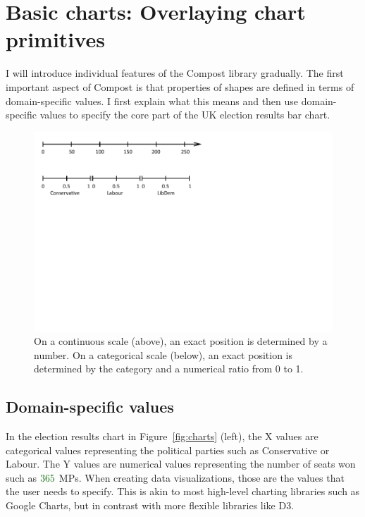\documentclass{jfp}
\newcommand{\num}[1]{\textcolor{numclr}{#1}}
\newcommand{\strf}[1]{\textnormal{\textcolor{strclr}{\sffamily #1}}}
\begin{document}
\section{Basic charts: Overlaying chart primitives}
I will introduce individual features of the Compost library gradually. The first important aspect of
Compost is that properties of shapes are defined in terms of domain-specific values. I first
explain what this means and then use domain-specific values to specify the core part of the
UK election results bar chart.

\begin{figure}[t]
\includegraphics[scale=1,trim={0cm 6.5cm 6cm 0cm},clip]{figures/values.pdf}
\caption{On a continuous scale (above), an exact position is determined by a number.
  On a categorical scale (below), an exact position is determined by the category and a
  numerical ratio from 0 to 1.}
\label{fig:scales}
\end{figure}

\subsection{Domain-specific values}

In the election results chart in Figure~\ref{fig:charts} (left), the X values are categorical
values representing the political parties such as \strf{Conservative} or \strf{Labour}. The
Y values are numerical values representing the number of seats won such as $\num{365}$ MPs.
When creating data visualizations, those are the values that the user needs to specify. This is
akin to most high-level charting libraries such as Google Charts, but in contrast with more
flexible libraries like D3.
\end{document}
